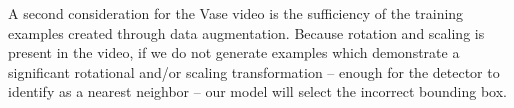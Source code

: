 \documentclass[10pt,twocolumn,letterpaper]{article}
\begin{document}
A second consideration for the Vase video is the sufficiency of the training examples created through data augmentation. Because rotation and scaling is present in the video, if we do not generate examples which demonstrate a significant rotational and/or scaling transformation -- enough for the detector to identify as a nearest neighbor -- our model will select the incorrect bounding box.

\newpage
\balance
{\small


}
\end{document}
